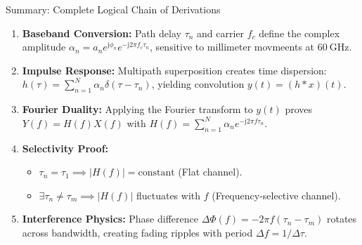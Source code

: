 \documentclass[10pt,aspectratio=169]{beamer}
\newcommand{\jj}{\mathrm{j}}
\begin{document}
\begin{frame}{Summary: Complete Logical Chain of Derivations}
  \begin{enumerate}
    \setlength{\itemsep}{0.22cm}
    \item \textbf{Baseband Conversion:} Path delay $\tau_n$ and carrier $f_c$ define the complex amplitude $\alpha_n = a_n e^{\jj\phi_n} e^{-\jj 2\pi f_c \tau_n}$, sensitive to millimeter movmeents at $\SI{60}{\giga\hertz}$.
    \item \textbf{Impulse Response:} Multipath superposition creates time dispersion: $h(\tau) = \sum_{n=1}^N \alpha_n \delta(\tau - \tau_n)$, yielding convolution $y(t) = (h*x)(t)$.
    \item \textbf{Fourier Duality:} Applying the Fourier transform to $y(t)$ proves $Y(f) = H(f)X(f)$ with $H(f) = \sum_{n=1}^N \alpha_n e^{-\jj 2\pi f \tau_n}$.
    \item \textbf{Selectivity Proof:}
    \begin{itemize}
      \item $\tau_n = \tau_1 \implies |H(f)| = \text{constant}$ (Flat channel).
      \item $\exists \tau_n \neq \tau_m \implies |H(f)|$ fluctuates with $f$ (Frequency-selective channel).
    \end{itemize}
    \item \textbf{Interference Physics:} Phase difference $\Delta\Phi(f) = -2\pi f (\tau_n - \tau_m)$ rotates across bandwidth, creating fading ripples with period $\Delta f = 1/\Delta\tau$.
  \end{enumerate}
\end{frame}
\end{document}
